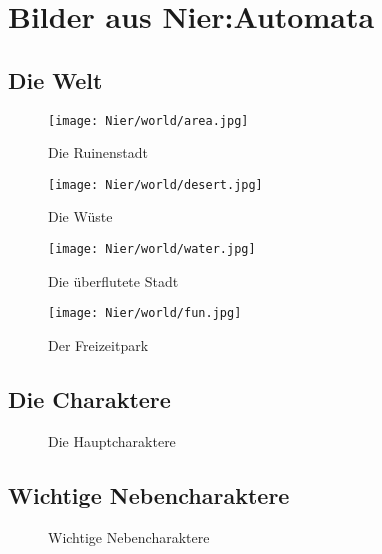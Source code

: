 
\centering
\chapter{Bilder aus Nier:Automata}

\section{Die Welt}


\begin{figure}[h!]
	\centering
	\texttt{[image: Nier/world/area.jpg]}
	\caption{Die Ruinenstadt}
	\label{img:passante}
\end{figure}

\begin{figure}[h!]
	\centering
	\texttt{[image: Nier/world/desert.jpg]}
	\caption{Die Wüste}
	\label{img:passante}
\end{figure}

\begin{figure}[h!]
	\centering
	\texttt{[image: Nier/world/water.jpg]}
	\caption{Die überflutete Stadt}
	\label{img:passante}
\end{figure}

\begin{figure}[h!]
	\centering
	\texttt{[image: Nier/world/fun.jpg]}
	\caption{Der Freizeitpark}
	\label{img:passante}
\end{figure}

\clearpage
\section{Die Charaktere}

\begin{figure}[hb!]
	\caption{Die Hauptcharaktere} 
\end{figure}


\clearpage
\section{Wichtige Nebencharaktere}

\begin{figure}[hb!]
	\caption{Wichtige Nebencharaktere} 
\end{figure}




